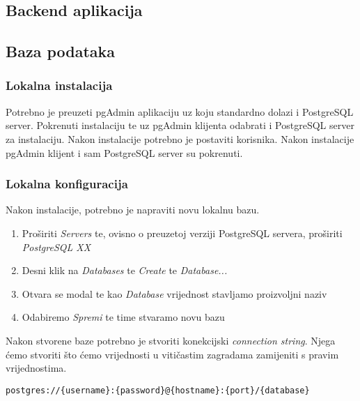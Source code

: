 			
			
			\subsection{Backend aplikacija}
		
		
			\subsection{Baza podataka}
		
		    \subsubsection*{Lokalna instalacija}
		    
		        Potrebno je preuzeti pgAdmin aplikaciju uz koju standardno dolazi i PostgreSQL server. Pokrenuti instalaciju te uz pgAdmin klijenta odabrati i PostgreSQL server za instalaciju. Nakon instalacije potrebno je postaviti korisnika. Nakon instalacije pgAdmin klijent i sam PostgreSQL server su pokrenuti.
		        
		    \subsubsection*{Lokalna konfiguracija}
		        
		        Nakon instalacije, potrebno je napraviti novu lokalnu bazu.
		        
		        \begin{enumerate}
		            \item Proširiti \textit{Servers} te, ovisno o preuzetoj verziji PostgreSQL servera, proširiti  \textit{PostgreSQL XX}
		            \item Desni klik na \textit{Databases} te \textit{Create} te \textit{Database...}
		            \item Otvara se modal te kao \textit{Database} vrijednost stavljamo proizvoljni naziv
		            \item Odabiremo \textit{Spremi} te time stvaramo novu bazu
		        \end{enumerate}
		        
		        Nakon stvorene baze potrebno je stvoriti konekcijski \textit{connection string}. Njega ćemo stvoriti što ćemo vrijednosti u vitičastim zagradama zamijeniti s pravim vrijednostima.
		        
		        \begin{lstlisting}
postgres://{username}:{password}@{hostname}:{port}/{database}
		        \end{lstlisting}
		        
